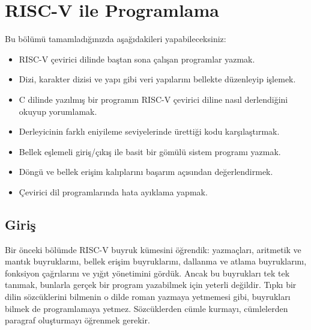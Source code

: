 
\chapter{RISC-V ile Programlama}
\label{chap:programlama}

\begin{tcolorbox}[
    colframe=sinyalyesil!60!black,
    title={\textbf{Öğrenme Hedefleri}},
    fonttitle=\bfseries,
    rounded corners,
    boxrule=0.8pt
]
Bu bölümü tamamladığınızda aşağıdakileri yapabileceksiniz:
\begin{itemize}[nosep, leftmargin=*]
    \item RISC-V çevirici dilinde baştan sona çalışan programlar yazmak.
    \item Dizi, karakter dizisi ve yapı gibi veri yapılarını bellekte düzenleyip işlemek.
    \item C dilinde yazılmış bir programın RISC-V çevirici diline nasıl derlendiğini okuyup yorumlamak.
    \item Derleyicinin farklı eniyileme seviyelerinde ürettiği kodu karşılaştırmak.
    \item Bellek eşlemeli giriş/çıkış ile basit bir gömülü sistem programı yazmak.
    \item Döngü ve bellek erişim kalıplarını başarım açısından değerlendirmek.
    \item Çevirici dil programlarında hata ayıklama yapmak.
\end{itemize}
\end{tcolorbox}

\section*{Giriş}

Bir önceki bölümde RISC-V buyruk kümesini öğrendik: yazmaçları, aritmetik ve mantık buyruklarını, bellek erişim buyruklarını, dallanma ve atlama buyruklarını, fonksiyon çağrılarını ve yığıt yönetimini gördük. Ancak bu buyrukları tek tek tanımak, bunlarla gerçek bir program yazabilmek için yeterli değildir. Tıpkı bir dilin sözcüklerini bilmenin o dilde roman yazmaya yetmemesi gibi, buyrukları bilmek de programlamaya yetmez. Sözcüklerden cümle kurmayı, cümlelerden paragraf oluşturmayı öğrenmek gerekir.

